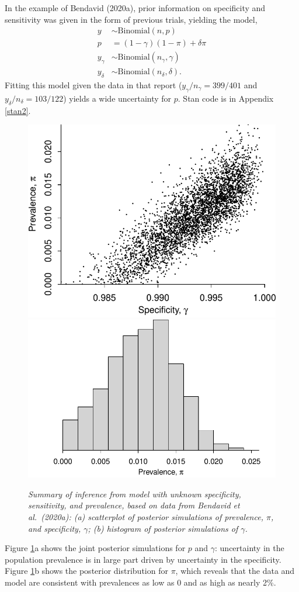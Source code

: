 \documentclass[11pt]{article}
\begin{document}
In the example of Bendavid (2020a), prior information on specificity and sensitivity was given in the form of previous trials, yielding the model,
  \begin{align*}
   y & \sim \mbox{Binomial} (n, p)\\
  p & = (1-\gamma)(1- \pi)+ \delta\pi\\
   y_{\gamma} & \sim \mbox{Binomial} (n_{\gamma}, \gamma)\\
   y_{\delta} & \sim \mbox{Binomial} (n_{\delta}, \delta).
 \end{align*}
 Fitting this model given the data in that report ($y_{\gamma}/n_{\gamma}=399/401$ and $y_{\delta}/n_{\delta}=103/122$) yields a wide uncertainty for $p$.  Stan code is in Appendix \ref{stan2}.

\begin{figure}
\centerline{ \includegraphics[width=.45\textwidth]{scatter.pdf} \includegraphics[width=.55\textwidth]{hist.pdf}}
\caption{\em Summary of inference from model with unknown specificity, sensitivity, and prevalence, based on data from Bendavid et al.\ (2020a):  (a) scatterplot of posterior simulations of prevalence, $\pi$, and specificity, $\gamma$; (b) histogram of posterior simulations of $\gamma$.}
\label{posterior1}
\end{figure}

Figure \ref{posterior1}a shows the joint posterior simulations for $p$ and $\gamma$:  uncertainty in the population prevalence is in large part driven by uncertainty in the specificity.  Figure \ref{posterior1}b shows the posterior distribution for $\pi$, which reveals that the data and model are consistent with prevalences as low as 0 and as high as nearly 2\%.
\end{document}
